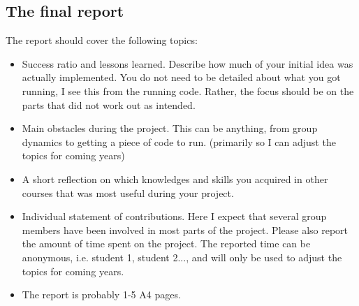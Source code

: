 \documentclass[fleqn, article, a4paper]{memoir}
\begin{document}
\subsection*{The final report}
\noindent The report should cover the following topics:
\begin{itemize}
\item Success ratio and lessons learned. Describe how much of your initial idea was actually implemented. You do not need to be detailed about what you got running, I see this from the running code. Rather, the focus should be on the parts that did not work out as intended.
\item Main obstacles during the project. This can be anything, from group dynamics to getting a piece of code to run. (primarily so I can adjust the topics for coming years)
\item A short reflection on which knowledges and skills you acquired in other courses that was most useful during your project.
\item Individual statement of contributions. Here I expect that several group members have been involved in most parts of the project. Please also report the amount of time spent on the project. The reported time can be anonymous, i.e. student 1, student 2..., and will only be used to adjust the topics for coming years.
\item The report is probably 1-5 A4 pages.
\end{itemize}

\end{document}

